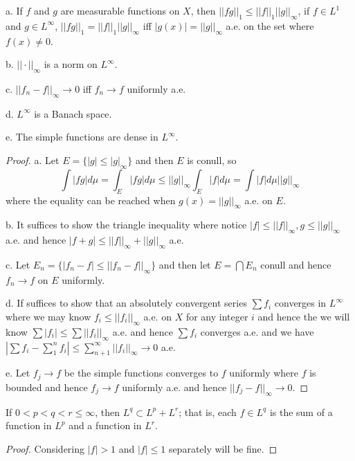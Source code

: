 \documentclass[lang=en, color=blue, ]{elegantbook}
\begin{document}
\begin{theorem}
    a. If $f$ and $g$ are measurable functions on $X$, then $||fg||_1 \leq ||f||_1||g||_{\infty}$, if $f\in L^1$ and $g\in L^{\infty}$, $||fg||_1 = ||f||_1||g||_{\infty}$ iff $|g(x)| = ||g||_{\infty}$ a.e. on the set where $f(x) \neq 0$.\par
    b. $||\cdot||_{\infty}$ is a norm on $L^{\infty}$.\par
    c. $||f_n-f||_{\infty} \to 0$ iff $f_n\to f$ uniformly a.e.\par
    d. $L^{\infty}$ is a Banach space.\par
    e. The simple functions are dense in $L^{\infty}$.
\end{theorem}

\begin{proof}
    a. Let $E = \{|g|\leq |g|_{\infty}\}$ and then $E$ is conull, so
    \[
    \int |fg| d\mu = \int_E |fg| d\mu \leq ||g||_{\infty} \int_E |f| d\mu = \int |f|d\mu ||g||_{\infty}
    \]
    where the equality can be reached when $g(x) = ||g||_{\infty}$ a.e. on $E$.\par
    b. It suffices to show the triangle inequality where notice $|f|\leq ||f||_{\infty},g\leq ||g||_{\infty}$ a.e. and hence $|f+g| \leq ||f||_{\infty}+||g||_{\infty}$ a.e.\par
    c. Let $E_n = \{|f_n-f| \leq ||f_n-f||_{\infty}\}$ and then let $E = \bigcap E_n$ conull and hence $f_n\to f$ on $E$ uniformly.\par
    d. If suffices to show that an absolutely convergent series $\sum f_i$ converges in $L^{\infty}$ where we may know $f_i \leq ||f_i||_{\infty}$ a.e. on $X$ for any integer $i$ and hence the we will know $\sum|f_i| \leq \sum ||f_i||_{\infty}$ a.e. and hence $\sum f_i$ converges a.e. and we have $|\sum f_i - \sum_1^n f_i| \leq \sum_{n+1}^{\infty} ||f_i||_{\infty} \to 0$ a.e.\par
    e. Let $f_j \to f$ be the simple functions converges to $f$ uniformly where $f$ is bounded and hence $f_j\to f$ uniformly a.e. and hence $||f_j - f||_{\infty} \to 0$. 
\end{proof}

\begin{proposition}
    If $0<p<q<r\leq \infty$, then $L^q \subset L^p + L^r$; that is, each $f\in L^q$ is the sum of a function in $L^p$ and a function in $L^r$. 
\end{proposition}
\begin{proof}\par
    Considering $|f|>1$ and $|f|\leq 1$ separately will be fine.
\end{proof}
\end{document}

